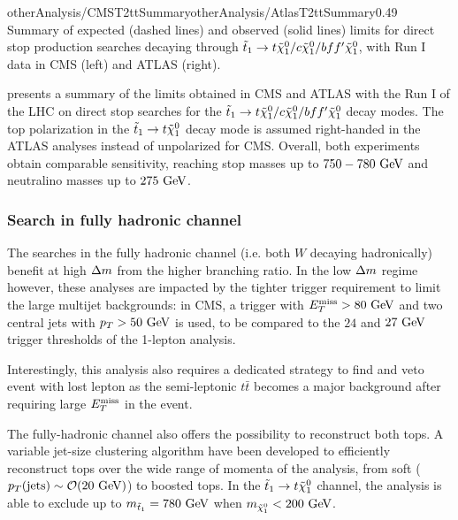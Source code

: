                      {otherAnalysis/CMST2ttSummary}{otherAnalysis/AtlasT2ttSummary}{0.49}
    {Summary of expected (dashed lines) and observed (solid lines) limits for direct stop
    production searches decaying through $\tilde{t}_1 \rightarrow t \tilde{\chi}_1^0 / c \tilde{\chi}_1^0 / b ff' \tilde{\chi}_1^0$,
    with Run I data in CMS (left) and ATLAS (right).}

     presents a summary of the limits obtained in CMS and ATLAS
    with the Run I of the LHC on direct stop searches for the $\tilde{t}_1 \rightarrow t \tilde{\chi}_1^0 / c \tilde{\chi}_1^0 / b ff' \tilde{\chi}_1^0$
    decay modes. The top polarization in the $\tilde{t}_1 \rightarrow t \tilde{\chi}_1^0$ decay mode
    is assumed right-handed in the ATLAS analyses instead of unpolarized for CMS. Overall,
    both experiments obtain comparable sensitivity, reaching stop masses up to $750-780~\text{GeV}$
    and neutralino masses up to $275~\text{GeV}$.

    \subsubsection{Search in fully hadronic channel}

    The searches in the fully hadronic channel (i.e. both $W$ decaying hadronically) \cite{SUS-13-023, ATLASstopSearches}
    benefit at high $\Delta m$ from the higher branching ratio. In the low $\Delta m$ regime however,
    these analyses are impacted by the tighter trigger requirement to limit the large multijet
    backgrounds: in CMS, a trigger with $E_T^\text{miss} > 80~\text{GeV}$ and two central jets with
    $p_T > 50~\text{GeV}$ is used, to be compared to the $24$ and $27~\text{GeV}$ trigger thresholds of
    the 1-lepton analysis.

    Interestingly, this analysis also requires a dedicated strategy to find and veto
    event with lost lepton as the semi-leptonic $t\bar{t}$ becomes a major background
    after requiring large $E_T^\text{miss}$ in the event.

    The fully-hadronic channel also offers the possibility to reconstruct both tops. A
    variable jet-size clustering algorithm have been developed to efficiently reconstruct
    tops over the wide range of momenta of the analysis, from soft ($p_T(\text{jets}) \sim
    \mathcal{O}(20~\text{GeV})$) to boosted tops.
    In the $\tilde{t}_1 \rightarrow t \tilde{\chi}_1^0$ channel, the analysis is able to exclude
    up to $m_{\tilde{t}_1} = 780~\text{GeV}$ when $m_{\tilde{\chi}_1^0} < 200~\text{GeV}$.

